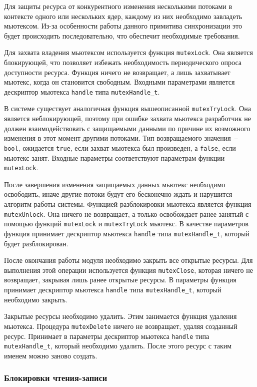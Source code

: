 Для защиты ресурса от конкурентного изменения несколькими потоками в контексте
одного или нескольких ядер, каждому из них необходимо завладеть мьютексом.
Из-за особенности работы данного примитива синхронизации это будет происходить
последовательно, что обеспечит необходимые требования.

Для захвата владения мьютексом используется функция \lstinline{mutexLock}. Она является блокирующей, что позволяет избежать необходимость периодического
опроса доступности ресурса. Функция ничего не возвращает, а лишь захватывает мьютекс, когда он становится свободным.
Входными параметрами является дескриптор мьютекса \lstinline{handle} типа \lstinline{mutexHandle_t}.

В системе существует аналогичная функция вышеописанной \lstinline{mutexTryLock}. Она является неблокирующей, поэтому при ошибке захвата мьютекса разработчик не должен
взаимодействовать с защищаемыми данными по причине их возможного изменения
в этот момент другими потоками. Тип возвращаемого значения~-- \lstinline{bool}, ожидается \lstinline{true}, если захват мьютекса был произведен, а \lstinline{false}, если
мьютекс занят. Входные параметры соответствуют параметрам функции \lstinline{mutexLock}.

После завершения изменения защищаемых данных мьютекс необходимо освободить, иначе другие потоки будут его бесконечно ждать и нарушится алгоритм работы системы. Функцией разблокировки мьютекса является функция \lstinline{mutexUnlock}.
Она ничего не возвращает, а только освобождает ранее занятый
с помощью функций \lstinline{mutexLock} и \lstinline{mutexTryLock} мьютекс.
В качестве параметров функция принимает дескриптор мьютекса \lstinline{handle} типа \lstinline{mutexHandle_t}, который будет разблокирован.

После окончания работы модуля необходимо закрыть все открытые ресурсы. Для выполнения этой операции используется функция \lstinline{mutexClose}, которая ничего не возвращает, закрывая лишь
ранее открытые ресурсы. В параметры функция принимает дескриптор мьютекса \lstinline{handle} типа \lstinline{mutexHandle_t}, который необходимо закрыть.

Закрытые ресурсы необходимо удалить. Этим занимается функция удаления мьютекса. Процедура \lstinline{mutexDelete} ничего не возвращает, удаляя созданный ресурс. Принимает в параметры
дескриптор мьютекса \lstinline{handle} типа \lstinline{mutexHandle_t}, который необходимо удалить.
После этого ресурс с таким именем можно заново создать.

\subsubsection{Блокировки чтения-записи}

